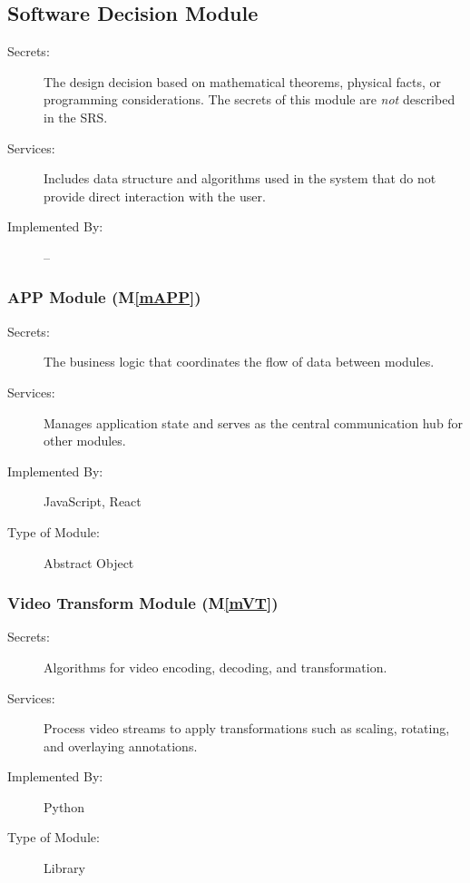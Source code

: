 \documentclass[12pt, titlepage]{article}
\newcommand{\mref}[1]{M\ref{#1}}
\begin{document}
\subsection{Software Decision Module}

\begin{description}
\item[Secrets:] The design decision based on mathematical theorems, physical
  facts, or programming considerations. The secrets of this module are
  \emph{not} described in the SRS.
\item[Services:] Includes data structure and algorithms used in the system that
  do not provide direct interaction with the user. 
\item[Implemented By:] --
\end{description}

\subsubsection{APP Module (\mref{mAPP})}

\begin{description}
\item[Secrets:] The business logic that coordinates the flow of data between modules.
\item[Services:] Manages application state and serves as the central communication hub for other modules.
\item[Implemented By:] JavaScript, React
\item[Type of Module:] Abstract Object
\end{description}

\subsubsection{Video Transform Module (\mref{mVT})}

\begin{description}
\item[Secrets:] Algorithms for video encoding, decoding, and transformation.
\item[Services:] Process video streams to apply transformations such as scaling, rotating, and overlaying annotations.
\item[Implemented By:] Python
\item[Type of Module:] Library
\end{description}
\end{document}
